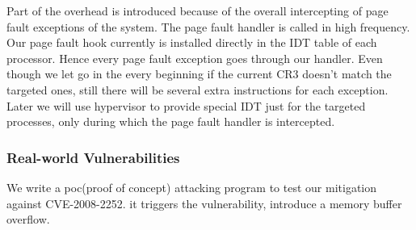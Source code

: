 

Part of the overhead is introduced because of the overall intercepting of page fault exceptions of the system. The page fault handler is called in high frequency. Our page fault hook currently is installed directly in the IDT table of each processor. Hence every page fault exception goes through our handler. Even though we let go in the every beginning if the current CR3 doesn't match the targeted ones, still there will be several extra instructions for each exception. Later we will use hypervisor to provide special IDT just for the targeted processes, only during which the page fault handler is intercepted.


\subsubsection{Real-world Vulnerabilities}

We write a poc(proof of concept) attacking program to test our mitigation against CVE-2008-2252. it triggers the vulnerability, introduce a memory buffer overflow. 


